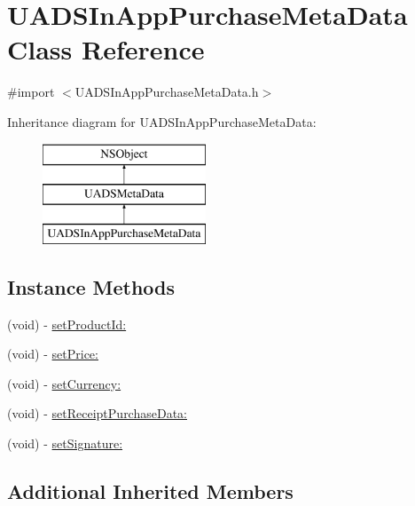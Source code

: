 \hypertarget{interface_u_a_d_s_in_app_purchase_meta_data}{}\section{U\+A\+D\+S\+In\+App\+Purchase\+Meta\+Data Class Reference}
\label{interface_u_a_d_s_in_app_purchase_meta_data}


{\ttfamily \#import $<$U\+A\+D\+S\+In\+App\+Purchase\+Meta\+Data.\+h$>$}

Inheritance diagram for U\+A\+D\+S\+In\+App\+Purchase\+Meta\+Data\+:\begin{figure}[H]
\begin{center}
\leavevmode
\includegraphics[height=3.000000cm]{interface_u_a_d_s_in_app_purchase_meta_data}
\end{center}
\end{figure}
\subsection*{Instance Methods}
\begin{DoxyCompactItemize}
\item 
(void) -\/ \mbox{\hyperlink{interface_u_a_d_s_in_app_purchase_meta_data_a1fe2c0cfa12449ca10ccf9f6cc09710c}{set\+Product\+Id\+:}}
\item 
(void) -\/ \mbox{\hyperlink{interface_u_a_d_s_in_app_purchase_meta_data_aac06922ee52cee65c6d32853ab4c55c5}{set\+Price\+:}}
\item 
(void) -\/ \mbox{\hyperlink{interface_u_a_d_s_in_app_purchase_meta_data_aff5038bcc67606edd6b9254fd958b687}{set\+Currency\+:}}
\item 
(void) -\/ \mbox{\hyperlink{interface_u_a_d_s_in_app_purchase_meta_data_ab75898c99eb5b179acadf4913751359f}{set\+Receipt\+Purchase\+Data\+:}}
\item 
(void) -\/ \mbox{\hyperlink{interface_u_a_d_s_in_app_purchase_meta_data_ac74a27c24ce21d0b675a0a9231756b1b}{set\+Signature\+:}}
\end{DoxyCompactItemize}
\subsection*{Additional Inherited Members}


